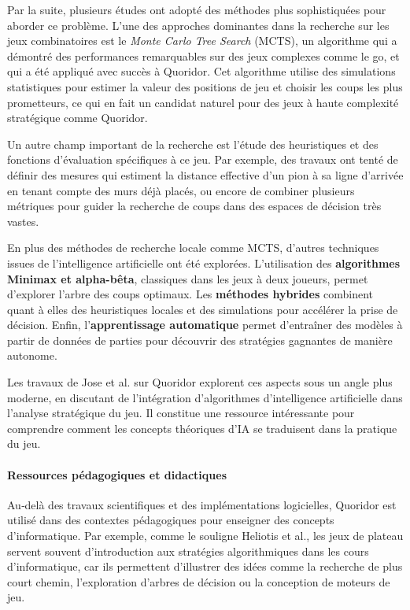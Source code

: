 \documentclass[a4paper]{article}
\begin{document}
Par la suite, plusieurs études ont adopté des méthodes plus sophistiquées pour aborder ce problème. L’une des approches dominantes dans la recherche sur les jeux combinatoires est le \textit{Monte Carlo Tree Search} (MCTS), un algorithme qui a démontré des performances remarquables sur des jeux complexes comme le go, et qui a été appliqué avec succès à Quoridor\cite{browne2012mcts,koirala2024artificial}. Cet algorithme utilise des simulations statistiques pour estimer la valeur des positions de jeu et choisir les coups les plus prometteurs, ce qui en fait un candidat naturel pour des jeux à haute complexité stratégique comme Quoridor.

Un autre champ important de la recherche est l’étude des heuristiques et des fonctions d’évaluation spécifiques à ce jeu. Par exemple, des travaux ont tenté de définir des mesures qui estiment la distance effective d’un pion à sa ligne d’arrivée en tenant compte des murs déjà placés, ou encore de combiner plusieurs métriques pour guider la recherche de coups dans des espaces de décision très vastes.


En plus des méthodes de recherche locale comme MCTS, d’autres techniques issues de l’intelligence artificielle ont été explorées. L'utilisation des \textbf{algorithmes Minimax et alpha-bêta}, classiques dans les jeux à deux joueurs, permet d'explorer l'arbre des coups optimaux. Les \textbf{méthodes hybrides} combinent quant à elles des heuristiques locales et des simulations pour accélérer la prise de décision. Enfin, l'\textbf{apprentissage automatique} permet d'entraîner des modèles à partir de données de parties pour découvrir des stratégies gagnantes de manière autonome.

Les travaux de Jose et al. sur Quoridor explorent ces aspects sous un angle plus moderne, en discutant de l’intégration d’algorithmes d’intelligence artificielle dans l’analyse stratégique du jeu\cite{jose2022quoridorai}. Il constitue une ressource intéressante pour comprendre comment les concepts théoriques d’IA se traduisent dans la pratique du jeu.

\paragraph{Ressources pédagogiques et didactiques}

Au‑delà des travaux scientifiques et des implémentations logicielles, Quoridor est utilisé dans
des contextes pédagogiques pour enseigner des concepts d’informatique. Par exemple, comme le souligne Heliotis et al.,
les jeux de plateau servent souvent d’introduction aux stratégies algorithmiques dans les cours d’informatique,
car ils permettent d’illustrer des idées comme la recherche de plus court chemin, l’exploration d’arbres de décision
ou la conception de moteurs de jeu\cite{bezakova2014}.
\end{document}
